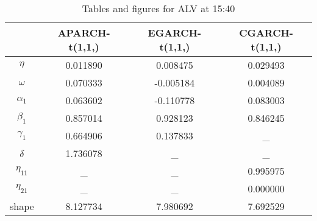 \begin{table}[!h]
 \small
  \caption{Tables and figures for ALV at 15:40}
  \label{coefalv1530}
  \centering
  \vspace{2ex} 
\begin{tabular}{c|c|c|c}
\toprule
	&APARCH-t(1,1,)&	EGARCH-t(1,1,)&	CGARCH-t(1,1,)\\
\midrule
\hline
$\eta$      &0.011890	&0.008475	&0.029493\\
$\omega$    &0.070333	&-0.005184	&0.004089\\
$\alpha_1$  &0.063602	&-0.110778	&0.083003\\
$\beta_1$   &0.857014	&0.928123	&0.846245\\
$\gamma_1$  &0.664906	&0.137833	&\_      \\
$\delta$    &1.736078	&\_			&\_      \\
$\eta_{11}$ &\_			&\_			&0.995975\\
$\eta_{21}$ &\_			&\_			&0.000000\\
shape		&8.127734	&7.980692	&7.692529\\
\bottomrule

\end{tabular}
\end{table}
